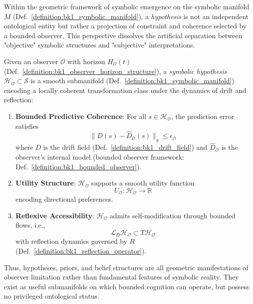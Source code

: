 \begin{scholium}
\label{scholium:bk1_hypotheses_as_submanifolds}
Within the geometric framework of symbolic emergence on the symbolic manifold $M$ (Def.~\ref{definition:bk1_symbolic_manifold}), a \emph{hypothesis} is not an independent ontological entity but rather a projection of constraint and coherence selected by a bounded observer. This perspective dissolves the artificial separation between "objective" symbolic structures and "subjective" interpretations.

\begin{definition}
\label{definition:bk1_symbolic_hypothesis}
Given an observer $\mathcal{O}$ with horizon $H_\mathcal{O}(t)$ (Def.~\ref{definition:bk1_observer_horizon_structure}), a \emph{symbolic hypothesis} $\mathcal{H}_\mathcal{O} \subset \mathcal{S}$ is a smooth submanifold (Def.~\ref{definition:bk1_symbolic_manifold}) encoding a locally coherent transformation class under the dynamics of drift and reflection:
\begin{enumerate}
    \item \textbf{Bounded Predictive Coherence}: For all \( s \in \mathcal{H}_\mathcal{O} \), the prediction error satisfies 
    \[
    \| D(s) - \hat{D}_\mathcal{O}(s) \|_g \leq \epsilon_\mathcal{O}
    \]
    where \( D \) is the drift field (Def.~\ref{definition:bk1_drift_field}) and \( \hat{D}_\mathcal{O} \) is the observer's internal model (bounded observer framework: Def.~\ref{definition:bk1_bounded_observer}).
    
    \item \textbf{Utility Structure}: \( \mathcal{H}_\mathcal{O} \) supports a smooth utility function 
    \[
    U_\mathcal{O}: \mathcal{H}_\mathcal{O} \to \mathbb{R}
    \]
    encoding directional preferences.

    \item \textbf{Reflexive Accessibility}: \( \mathcal{H}_\mathcal{O} \) admits self-modification through bounded flows, i.e., 
    \[
    \mathcal{L}_D \mathcal{H}_\mathcal{O} \subset T\mathcal{H}_\mathcal{O}
    \]
    with reflection dynamics governed by \( R \) (Def.~\ref{definition:bk1_reflection_operator}).
\end{enumerate}
\end{definition}

Thus, hypotheses, priors, and belief structures are all geometric manifestations of observer limitation rather than fundamental features of symbolic reality. They exist as useful submanifolds on which bounded cognition can operate, but possess no privileged ontological status.
\end{scholium}

